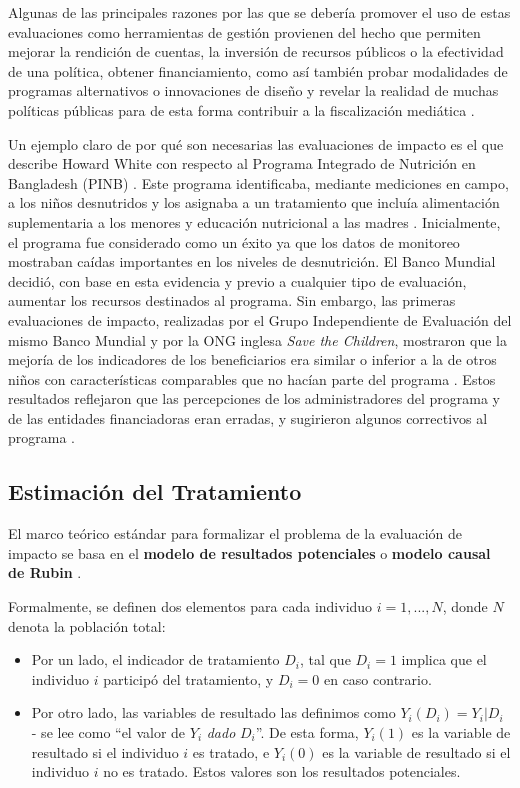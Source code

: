 \documentclass[../../main.tex]{subfiles}
\begin{document}
Algunas de las principales razones por las que se debería promover el uso de estas
evaluaciones como herramientas de gestión provienen del hecho que permiten mejorar la
rendición de cuentas, la inversión de recursos públicos o la efectividad de una política,
obtener financiamiento, como así también probar modalidades de programas alternativos o
innovaciones de diseño \cite{gertler-2016} y revelar la realidad de muchas políticas
públicas para de esta forma contribuir a la fiscalización mediática \cite{bernal}.

Un ejemplo claro de por qué son necesarias las evaluaciones de impacto es el que describe
Howard White con respecto al Programa Integrado de Nutrición en Bangladesh (PINB)
\cite{white2009theory}. Este programa identificaba, mediante mediciones en campo, a los
niños desnutridos y los asignaba a un tratamiento que incluía alimentación suplementaria a
los menores y educación nutricional a las madres \cite{bernal}. Inicialmente, el programa
fue considerado como un éxito ya que los datos de monitoreo mostraban caídas importantes
en los niveles de desnutrición. El Banco Mundial decidió, con base en esta evidencia y
previo a cualquier tipo de evaluación, aumentar los recursos destinados al programa. Sin
embargo, las primeras evaluaciones de impacto, realizadas por el Grupo Independiente de
Evaluación del mismo Banco Mundial y por la ONG inglesa \textit{Save the Children},
mostraron que la mejoría de los indicadores de los beneficiarios era similar o inferior a
la de otros niños con características comparables que no hacían parte del programa
\cite{bernal}. Estos resultados reflejaron que las percepciones de los administradores del
programa y de las entidades financiadoras eran erradas, y sugirieron algunos correctivos
al programa \cite{bernal}.

\subsection{Estimación del Tratamiento}
El marco teórico estándar para formalizar el problema de la evaluación de impacto se basa
en el \textbf{modelo de resultados potenciales} o \textbf{modelo causal de Rubin}
\cite{rubin1974}.

Formalmente, se definen dos elementos para cada individuo \(i = 1,...,N\), donde \(N\)
denota la población total:
\begin{itemize}
    \item Por un lado, el indicador de tratamiento \(D_i\), tal que \(D_i = 1\) implica
    que el individuo \(i\) participó del tratamiento, y \(D_i = 0\) en caso contrario.
    \item Por otro lado, las variables de resultado las definimos como \(Y_i(D_i) =
    Y_i|D_i\) - se lee como ``el valor de \(Y_i\) \textit{dado} \(D_i\)''. De esta forma,
    \(Y_i(1)\) es la variable de resultado si el individuo \(i\) es tratado, e \(Y_i(0)\)
    es la variable de resultado si el individuo \(i\) no es tratado. Estos valores son los
    resultados potenciales.
\end{itemize}
\end{document}
